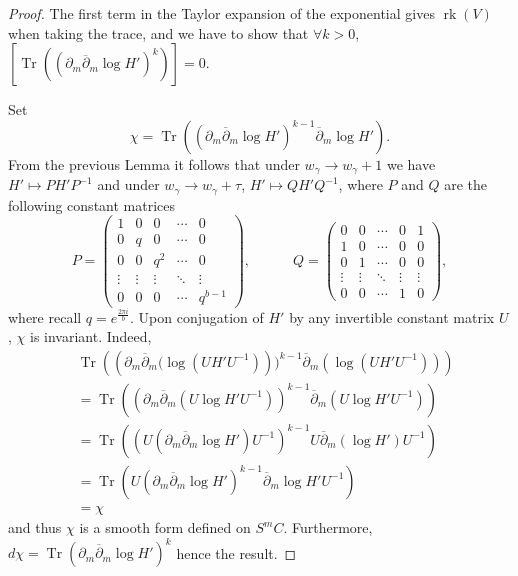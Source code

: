 \documentclass[10pt,a4paper]{amsart}
\newcommand{\ov}[1]{\overline{#1}}
\DeclareMathOperator{\rk}{rk}
\DeclareMathOperator{\tr}{Tr}
\begin{document}
\begin{proof}
The first term in the Taylor expansion of the exponential gives $\rk(V)$ when taking the trace, and we have to show that $\forall k>0$, $[\tr \left( (\partial_m \ov{\partial}_m \log H')^k\right)]=0$.

Set $$\chi=\tr \left( \left(\partial_m \ov{\partial}_m \log H'\right)^{k-1} \ov{\partial}_m \log H' \right).$$ 
From the previous Lemma it follows that
under $w_\gamma \to w_\gamma+1$ we have $H' \mapsto PH'P^{-1}$ and under $w_\gamma \to w_\gamma+\tau$, $H' \mapsto QH'Q^{-1}$, where $P$ and $Q$ are the following constant matrices
\[
P=
\begin{pmatrix}
1 & 0 & 0 & \cdots & 0 \\
0 & q & 0 & \cdots & 0 \\
0 & 0 & q^2 & \cdots & 0 \\
\vdots & \vdots & \vdots & \ddots & \vdots \\
0 & 0 & 0 & \cdots & q^{b-1}
\end{pmatrix},\quad\quad\quad Q= 
\begin{pmatrix}
0 & 0 & \cdots & 0 & 1 \\
1 & 0 & \cdots & 0 & 0 \\
0 & 1 & \cdots & 0 & 0 \\
\vdots & \vdots & \ddots & \vdots & \vdots \\
0 & 0 & \cdots & 1 & 0
\end{pmatrix},
\]
where recall $q=e^{\frac{2\pi i}{b}}$.
Upon conjugation of $H'$ by any invertible constant matrix $U$, $\chi$ is invariant. Indeed,
\begin{align*}
    &\tr \left( \left(\partial_m \ov{\partial}_m (\log (UH'U^{-1})\right))^{k-1} \ov{\partial}_m (\log (UH'U^{-1}))\right)\\
    &=\tr \left( \left(\partial_m \ov{\partial}_m (U\log H'U^{-1})\right)^{k-1} \ov{\partial}_m (U\log H'U^{-1})\right)\\
    &=\tr \left(  \left(U(\partial_m \ov{\partial}_m \log H' )U^{-1}\right)^{k-1} U\ov{\partial}_m (\log H')U^{-1}\right)\\
    &=\tr \left( U \left(\partial_m \ov{\partial}_m \log H' \right)^{k-1} \ov{\partial}_m \log H' U^{-1}\right)\\
    &=\chi
\end{align*} and thus $\chi$ is a smooth form defined on $S^m C$. Furthermore, $d\chi=\tr \left(\partial_m \ov{\partial}_m \log H'\right)^k$ hence the result.

\end{proof}
\end{document}

